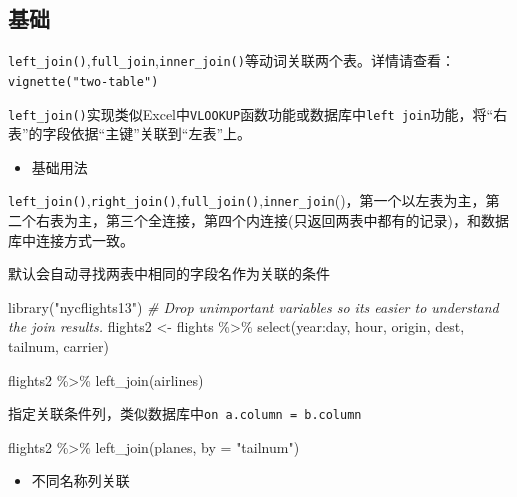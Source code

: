 \documentclass[
]{book}
\newenvironment{Shaded}{\begin{snugshade}}{\end{snugshade}}
\newcommand{\AttributeTok}[1]{\textcolor[rgb]{0.77,0.63,0.00}{#1}}
\newcommand{\CommentTok}[1]{\textcolor[rgb]{0.56,0.35,0.01}{\textit{#1}}}
\newcommand{\FunctionTok}[1]{\textcolor[rgb]{0.00,0.00,0.00}{#1}}
\newcommand{\NormalTok}[1]{#1}
\newcommand{\OtherTok}[1]{\textcolor[rgb]{0.56,0.35,0.01}{#1}}
\newcommand{\SpecialCharTok}[1]{\textcolor[rgb]{0.00,0.00,0.00}{#1}}
\newcommand{\StringTok}[1]{\textcolor[rgb]{0.31,0.60,0.02}{#1}}
\providecommand{\tightlist}{%
  \setlength{\itemsep}{0pt}\setlength{\parskip}{0pt}}
\begin{document}
\hypertarget{ux57faux7840}{%
\subsection{基础}\label{ux57faux7840}}

\texttt{left\_join()},\texttt{full\_join},\texttt{inner\_join()}等动词关联两个表。详情请查看：\texttt{vignette("two-table")}

\texttt{left\_join()}实现类似Excel中\texttt{VLOOKUP}函数功能或数据库中\texttt{left\ join}功能，将``右表''的字段依据``主键''关联到``左表''上。

\begin{itemize}
\tightlist
\item
  基础用法
\end{itemize}

\texttt{left\_join()},\texttt{right\_join()},\texttt{full\_join()},\texttt{inner\_join}()，第一个以左表为主，第二个右表为主，第三个全连接，第四个内连接(只返回两表中都有的记录)，和数据库中连接方式一致。

默认会自动寻找两表中相同的字段名作为关联的条件

\begin{Shaded}
\begin{Highlighting}[]
\FunctionTok{library}\NormalTok{(}\StringTok{"nycflights13"}\NormalTok{)}
\CommentTok{\# Drop unimportant variables so it\textquotesingle{}s easier to understand the join results.}
\NormalTok{flights2 }\OtherTok{\textless{}{-}}\NormalTok{ flights }\SpecialCharTok{\%\textgreater{}\%} \FunctionTok{select}\NormalTok{(year}\SpecialCharTok{:}\NormalTok{day, hour, origin, dest, tailnum, carrier)}

\NormalTok{flights2 }\SpecialCharTok{\%\textgreater{}\%} 
  \FunctionTok{left\_join}\NormalTok{(airlines)}
\end{Highlighting}
\end{Shaded}

指定关联条件列，类似数据库中\texttt{on\ a.column\ =\ b.column}

\begin{Shaded}
\begin{Highlighting}[]
\NormalTok{flights2 }\SpecialCharTok{\%\textgreater{}\%} \FunctionTok{left\_join}\NormalTok{(planes, }\AttributeTok{by =} \StringTok{"tailnum"}\NormalTok{)}
\end{Highlighting}
\end{Shaded}

\begin{itemize}
\tightlist
\item
  不同名称列关联
\end{itemize}
\end{document}
